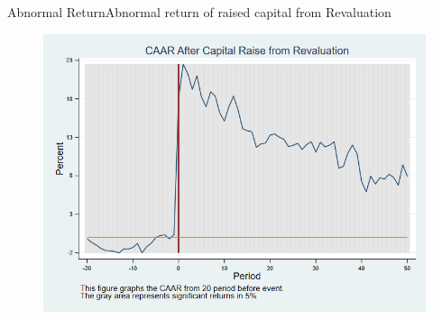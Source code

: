 \documentclass{beamer}
\begin{document}
	
	
	
	
	
	\begin{frame}{Abnormal Return}{Abnormal return of raised capital from Revaluation}
		\label{abreturnrevalution}
		\begin{figure}
			\centering
			\includegraphics[width=0.65\linewidth]{Output/CARRevaluation.png}
			\label{fig:abreturnrevalution}
		\end{figure}
		
		\hfill\hyperlink{abreturnrevalution4Factor}{}
	\end{frame}
	
\end{document}
